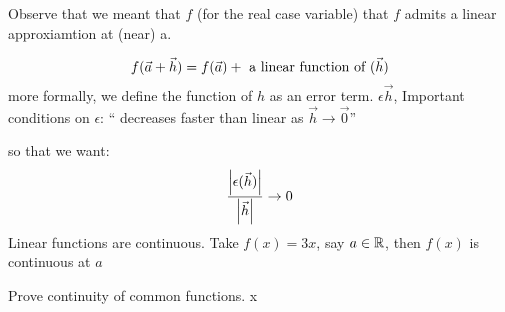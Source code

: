 Observe that we meant that $f$ (for the real case variable) that $f$ admits a linear approxiamtion at (near) a.


\[ f(\vec{a} + \vec{h})  = f(\vec{a}) + \textrm{ a linear function of }(\vec{h})\]
more formally, we define the function of $h$ as an error term. $ \epsilon \vec{h} $,
Important conditions on $ \epsilon $: `` decreases faster than linear as $ \vec{h} \rightarrow \vec{0} $'' 

so that we want:
\[ \frac{\left| \epsilon(\vec{h}) \right|}{\left| \vec{h} \right|} \rightarrow 0 \]
Linear functions are continuous. 
Take $f(x) = 3x $, say $a \in \mathbb{R}$, then $f(x) $ is continuous at $a$ 	


Prove continuity of common functions.
x